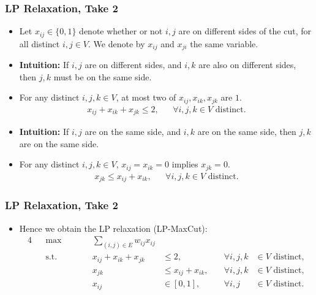 \documentclass{beamer}
\begin{document}
    \begin{frame}
        \frametitle{LP Relaxation, Take 2}
    
        \begin{itemize}
            \item Let $x_{ij} \in \{ 0, 1 \}$ denote whether or not $i, j$ are on different sides of the cut, for all distinct $i, j \in V$. We denote by $x_{ij}$ and $x_{ji}$ the same variable. \pause
            \item {\bf Intuition:} If $i, j$ are on different sides, and $i, k$ are also on different sides, then $j, k$ must be on the same side. \pause
            \item For any distinct $i, j, k \in V$, at most two of $x_{ij}, x_{ik}, x_{jk}$ are $1$. \pause
            \begin{align*}
                x_{ij} + x_{ik} + x_{jk} \leq 2, && \forall i, j, k \in V \text{ distinct}.
            \end{align*}
            \pause
            \vspace{-1em}
            \item {\bf Intuition:} If $i, j$ are on the same side, and $i, k$ are on the same side, then $j, k$ are on the same side. \pause
            \item For any distinct $i, j, k \in V$, $x_{ij} = x_{ik} = 0$ implies $x_{jk} = 0$. \pause
            \begin{align*}
                x_{jk} \leq x_{ij} + x_{ik}, && \forall i, j, k \in V \text{ distinct}.
            \end{align*}
        \end{itemize}
    \end{frame}

    \begin{frame}
        \frametitle{LP Relaxation, Take 2}
    
        \begin{itemize}
            \item Hence we obtain the LP relaxation {\sc (LP-MaxCut)}:
            \begin{alignat*}{4}
                && \max \qquad && \sum_{(i, j) \in E} w_{ij} x_{ij} \\
                && \text{s.t.} \qquad && x_{ij} + x_{ik} + x_{jk} & \leq 2, & \quad \forall i, j, k & \in V \text{ distinct}, \\
                && && x_{jk} & \leq x_{ij} + x_{ik}, & \quad \forall i, j, k & \in V \text{ distinct}, \\
                && && x_{ij} & \in [0, 1], & \quad \forall i, j & \in V \text{ distinct}.
              \end{alignat*}
        \end{itemize}
    \end{frame}
\end{document}
